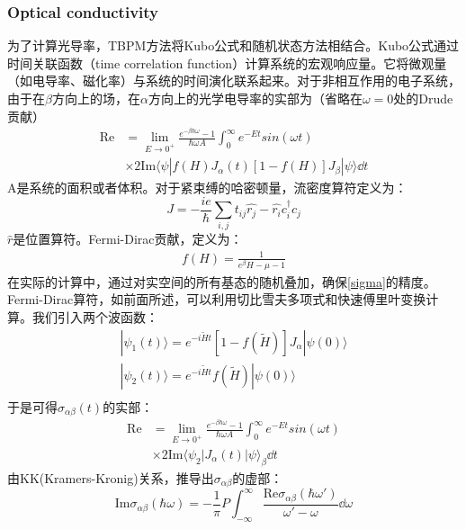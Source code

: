 \subsubsection{Optical conductivity}
\qquad 为了计算光导率，TBPM方法将Kubo公式和随机状态方法相结合。Kubo公式通过时间关联函数（time correlation function）计算系统的宏观响应量。它将微观量（如电导率、磁化率）与系统的时间演化联系起来。对于非相互作用的电子系统，由于在$\beta$方向上的场，在$\alpha$方向上的光学电导率的实部为（省略在$\omega=0$处的Drude贡献）
\begin{equation}
    \begin{aligned}
        \text{Re}&=\lim_{E\rightarrow 0^+}\frac{e^{-\beta \hbar \omega}-1}{\hbar\omega A}\int_{0}^{\infty}e^{-Et}sin(\omega t)\\ &\times 2\text{Im}\langle\psi|f(H)J_{\alpha}(t)[1-f(H)]J_{\beta}|\psi\rangle \dd{t}
        \label{sigma}
    \end{aligned}
\end{equation}
A是系统的面积或者体积。对于紧束缚的哈密顿量，流密度算符定义为：
\begin{equation}
    J=-\frac{ie}{\hbar}\sum_{i,j}t_{ij}{\hat{r_j}-\hat{r_i}c^{\dag}_ic_j}
\end{equation}
$\hat{r}$是位置算符。Fermi-Dirac贡献，定义为：
\begin{align}
    f(H)=\frac{1}{e^\beta{H-\mu}-1}
\end{align}
在实际的计算中，通过对实空间的所有基态的随机叠加，确保\ref{sigma}的精度。Fermi-Dirac算符，如前面所述，可以利用切比雪夫多项式和快速傅里叶变换计算。我们引入两个波函数：
\begin{equation}
    \begin{aligned}
        |\psi_1(t)\rangle=e^{-i\tilde{H}t}[1-f(\tilde{H})]J_{\alpha}|\psi(0)\rangle\\
        |\psi_2(t)\rangle=e^{-i\tilde{H}t}f(\tilde{H})|\psi(0)\rangle\\
    \end{aligned}
\end{equation}
于是可得$\sigma_{\alpha\beta}(t)$的实部：
\begin{equation}
    \begin{aligned}
        \text{Re}&=\lim_{E\rightarrow 0^+}\frac{e^{-\beta \hbar \omega}-1}{\hbar\omega A}\int_{0}^{\infty}e^{-Et}sin(\omega t)\\ &\times 2\text{Im}\langle\psi_2|J_{\alpha}(t)|\psi\rangle_{\beta} \dd{t}
        \label{sigma}
    \end{aligned}
\end{equation}
由KK(Kramers-Kronig)关系，推导出$\sigma_{\alpha\beta}$的虚部：
\begin{equation}
    \text{Im}\sigma_{\alpha\beta}(\hbar\omega)=-\frac{1}{\pi}P\int_{-\infty}^{\infty}\frac{\text{Re} \sigma_{\alpha\beta}(\hbar\omega')}{\omega'-\omega}\dd{\omega}
\end{equation}
